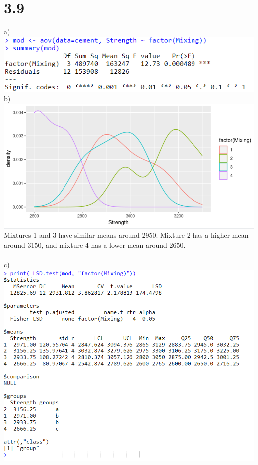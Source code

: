 \documentclass{article}
\begin{document}
\section*{3.9}
a)
\\\includegraphics{3.9a.PNG}
\\b) 
\\\includegraphics{3.9b.PNG}
\\Mixtures 1 and 3 have similar means around 2950. Mixture 2 has a higher mean around 3150, and mixture 4 has a lower mean around 2650.
\\
\\c)
\\\includegraphics{3.9c.PNG}
\end{document}
